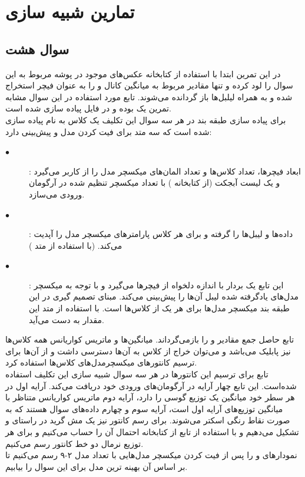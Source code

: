 \documentclass[12pt,onecolumn,a4paper]{article}
\begin{document}
\section{تمارین شبیه سازی}
\subsection{سوال هشت}
در این تمرین ابتدا با استفاده از کتابخانه  عکس‌های موجود در پوشه مربوط به این سوال را لود کرده و تنها مقادیر مربوط به میانگین کانال  و  را به عنوان فیچر استخراج شده و به همراه لیلبل‌ها باز گردانده می‌شوند. تابع مورد استفاده در این سوال مشابه تمرین یک بوده و در فایل  پیاده سازی شده است.
\\
برای پیاده سازی طبقه بند در هر سه سوال  این تکلیف یک کلاس به نام  پیاده سازی شده است که سه متد برای فیت کردن مدل و پیش‌بینی دارد:
\begin{description}
    \item[$\bullet$] : ابعاد فیچرها، تعداد کلاس‌ها و تعداد المان‌های میکسچر مدل را از کاربر می‌گیرد و یک لیست آبجکت  (از کتابخانه ) با تعداد میکسچر تنظیم شده در آرگومان ورودی می‌سازد.
    \item[$\bullet$] : داده‌ها و لیبل‌ها را گرفته و برای هر کلاس پارامترهای میکسچر مدل را آپدیت می‌کند. (با استفاده از متد )
    \item[$\bullet$]  : این تابع یک بردار با اندازه دلخواه از فیچرها می‌گیرد و با توجه به میکسچر مدل‌های یادگرفته شده لیبل آن‌ها را پیش‌بینی می‌کند. مبنای تصمیم گیری در این طبقه بند  میکسچر مدل‌ها برای هر یک از کلاس‌ها است. با استفاده از متد  این مقدار به دست می‌آید.
\end{description}
تابع  حاصل جمع مقادیر  و  را بازمی‌گرداند. میانگین‌ها و ماتریس کواریانس همه کلاس‌ها نیز پابلیک می‌باشد و می‌توان خراج از کلاس به آن‌ها دسترسی داشت و از آن‌ها برای ترسیم کانتورهای میکسچرمدل‌های کلاس‌ها استفاده کرد.
\\
تابع  برای ترسیم این کانتورها در هر سه سوال شبیه سازی این تکلیف استفاده شده‌است. این تابع چهار آرایه  در آرگومان‌های ورودی خود دریافت می‌کند. آرایه اول در هر سطر خود میانگین یک توزیع گوسی را دارد، آرایه دوم ماتریس کواریانس متناظر با میانگین‌ توزیع‌های آرایه اول است، آرایه سوم و چهارم داده‌های سوال هستند که به صورت نقاط رنگی اسکتر می‌شوند. برای رسم کانتور نیز یک مش گرید در راستای  و  تشکیل می‌دهیم و با استفاده از تابع  از کتابخانه  احتمال آن را حساب می‌کنیم و برای هر توزیع نرمال دو خط کانتور رسم می‌کنیم.
\\
نمودارهای  و  را پس از فیت کردن میکسچر مدل‌هایی با تعداد مدل ۲-۹ رسم می‌کنیم تا بر اساس آن بهینه ترین مدل برای این سوال را بیابیم.
\end{document}
